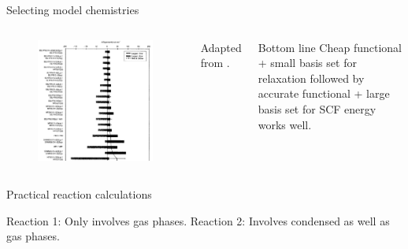 \documentclass[aspectratio=169]{beamer}
\begin{document}
    \begin{frame}{Selecting model chemistries}
        \begin{columns}
            \begin{figure}
                \centering
                \includegraphics[width=0.45\linewidth]{lectures/figures/4_model_chem.png}
            \end{figure}
            Adapted from \cite{foresmanExploringChemistryElectronic1996}.

            \begin{alertblock}{Bottom line}
                Cheap functional + small basis set for relaxation followed by accurate functional + large basis set for SCF energy works well.

            \end{alertblock}

        \end{columns}

    \end{frame}

    \begin{frame}{Practical reaction calculations}

        Reaction 1: Only involves gas phases.\newline
        \newline
        \newline
        \newline
        Reaction 2: Involves condensed as well as gas phases.\newline
        \newline

    \end{frame}
\end{document}
